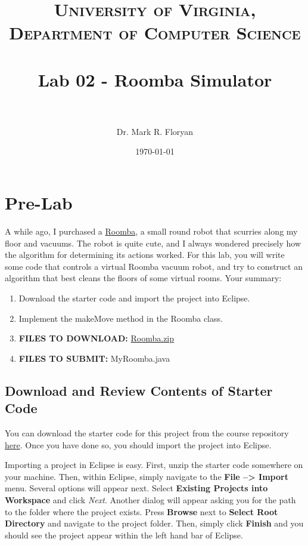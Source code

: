 \documentclass[paper=a4, fontsize=11pt, parskip=full]{scrartcl} %
\title{	
\normalfont \normalsize 
\textsc{University of Virginia, Department of Computer Science} \\ [25pt] %
\horrule{0.5pt} \\[0.4cm] %
\huge Lab 02 - Roomba Simulator \\ %
\horrule{2pt} \\[0.5cm] %
}
\author{Dr. Mark R. Floryan} %
\date{\normalsize\today} %
\numberwithin{equation}{section} %
\numberwithin{figure}{section} %
\numberwithin{table}{section} %
\begin{document}
\maketitle %


\section{Pre-Lab}

A while ago, I purchased a \href{https://www.irobot.com/For-the-Home/Vacuuming/Roomba.aspx}{Roomba}, a small round robot that scurries along my floor and vacuums. The robot is quite cute, and I always wondered precisely how the algorithm for determining its actions worked. For this lab, you will write some code that controls a virtual Roomba vacuum robot, and try to construct an algorithm that best cleans the floors of some virtual rooms. Your summary:

\begin{enumerate}
	\item Download the starter code and import the project into Eclipse.
	\item Implement the makeMove method in the Roomba class.
	\item \textbf{FILES TO DOWNLOAD:} \href{https://markfloryan.github.io/dsa1/labs/lab02%20-%20Roomba/code/Roomba.zip}{Roomba.zip}
	\item \textbf{FILES TO SUBMIT:} MyRoomba.java
\end{enumerate}


\subsection{Download and Review Contents of Starter Code}

You can download the starter code for this project from the course repository \href{https://markfloryan.github.io/dsa1/labs/lab02%20-%20Roomba/code/Roomba.zip}{here}. Once you have done so, you should import the project into Eclipse.

Importing a project in Eclipse is easy. First, unzip the starter code somewhere on your machine. Then, within Eclipse, simply navigate to the \textbf{File --> Import} menu. Several options will appear next. Select \textbf{Existing Projects into Workspace} and click \emph{Next}. Another dialog will appear asking you for the path to the folder where the project exists. Press \textbf{Browse} next to \textbf{Select Root Directory} and navigate to the project folder. Then, simply click \textbf{Finish} and you should see the project appear within the left hand bar of Eclipse.
\end{document}
